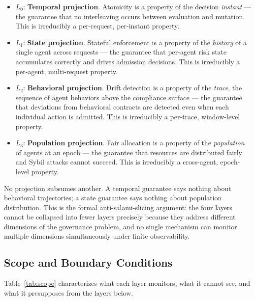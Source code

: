 \documentclass[11pt]{article}
\newcommand{\Layer}[1]{L_{#1}}
\begin{document}
\begin{itemize}[noitemsep]
  \item $\Layer{0}$: \textbf{Temporal projection}. Atomicity is a property of
    the decision \emph{instant} --- the guarantee that no interleaving occurs
    between evaluation and mutation. This is irreducibly a per-request,
    per-instant property.

  \item $\Layer{1}$: \textbf{State projection}. Stateful enforcement is a
    property of the \emph{history} of a single agent across requests --- the
    guarantee that per-agent risk state accumulates correctly and drives
    admission decisions. This is irreducibly a per-agent, multi-request
    property.

  \item $\Layer{2}$: \textbf{Behavioral projection}. Drift detection is a
    property of the \emph{trace}, the sequence of agent behaviors above the
    compliance surface --- the guarantee that deviations from behavioral
    contracts are detected even when each individual action is admitted. This
    is irreducibly a per-trace, window-level property.

  \item $\Layer{3}$: \textbf{Population projection}. Fair allocation is a
    property of the \emph{population} of agents at an epoch --- the guarantee
    that resources are distributed fairly and Sybil attacks cannot succeed.
    This is irreducibly a cross-agent, epoch-level property.
\end{itemize}

No projection subsumes another. A temporal guarantee says nothing about
behavioral trajectories; a state guarantee says nothing about population
distribution. This is the formal anti-salami-slicing argument: the four layers
cannot be collapsed into fewer layers precisely because they address different
dimensions of the governance problem, and no single mechanism can monitor
multiple dimensions simultaneously under finite observability.

\subsection{Scope and Boundary Conditions}

Table~\ref{tab:scope} characterizes what each layer monitors, what it cannot
see, and what it presupposes from the layers below.
\end{document}
